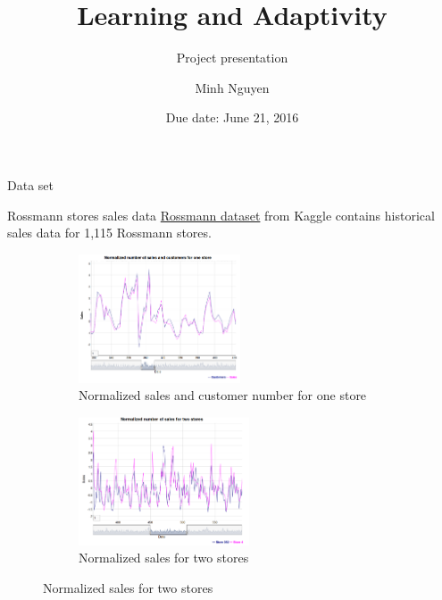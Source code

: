 \documentclass[10pt]{beamer}
\title{Learning and Adaptivity}
\subtitle{Project presentation}
\date{Due date: June 21, 2016}
\author{Minh Nguyen}
\begin{document}
\maketitle

\begin{frame}{Data set}
    \begin{alertblock}{Rossmann stores sales data}
        \href{https://www.kaggle.com/c/rossmann-store-sales/data}{Rossmann dataset} from Kaggle contains historical sales data for 1,115 Rossmann stores.
        \begin{figure}[t!]
            \begin{subfigure}[t]{0.5\textwidth}
                \centering
                \includegraphics[height=1.5in]{rossmann_visualization_sales-customers}
                \caption{Normalized sales and customer number for one store}
            \end{subfigure}%
            \begin{subfigure}[t]{0.5\textwidth}
                \centering
                \includegraphics[height=1.5in]{rossmann_visualization_two-stores}
                \caption{Normalized sales for two stores}
            \end{subfigure}
            \label{fig:sub1}
            \end{figure}
        \end{alertblock}
\end{frame}
\end{document}
